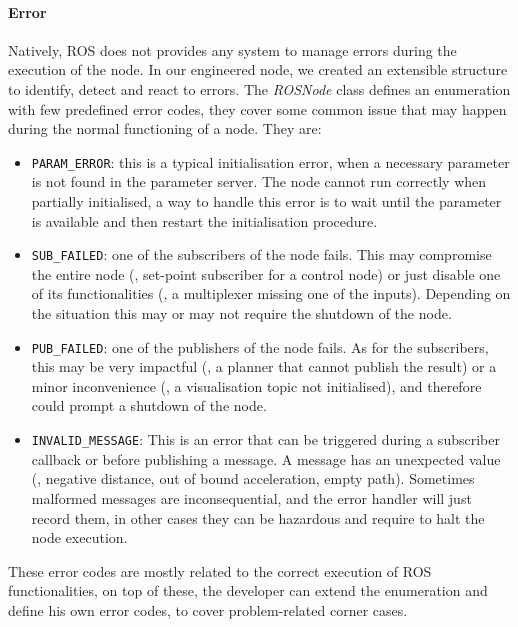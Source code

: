 \paragraph{Error} Natively, ROS does not provides any system to manage errors during the execution of the node. In our engineered node, we created an extensible structure to identify, detect and react to errors. The \textit{ROSNode} class defines an enumeration with few predefined error codes, they cover some common issue that may happen during the normal functioning of a node. They are:
\begin{itemize}
\item \texttt{PARAM\_ERROR}: this is a typical initialisation error, when a necessary parameter is not found in the parameter server. The node cannot run correctly when partially initialised, a way to handle this error is to wait until the parameter is available and then restart the initialisation procedure.
\item \texttt{SUB\_FAILED}: one of the subscribers of the node fails. This may compromise the entire node (\eg, set-point subscriber for a control node) or just disable one of its functionalities (\eg, a multiplexer missing one of the inputs). Depending on the situation this may or may not require the shutdown of the node. 
\item \texttt{PUB\_FAILED}: one of the publishers of the node fails. As for the subscribers, this may be very impactful (\eg, a planner that cannot publish the result) or a minor inconvenience (\eg, a visualisation topic not initialised), and therefore could prompt a shutdown of the node.
\item \texttt{INVALID\_MESSAGE}: This is an error that can be triggered during a subscriber callback or before publishing a message. A message has an unexpected value (\eg, negative distance, out of bound acceleration, empty path). Sometimes malformed messages are inconsequential, and the error handler will just record them, in other cases they can be hazardous and require to halt the node execution. 
\end{itemize}

These error codes are mostly related to the correct execution of ROS functionalities, on top of these, the developer can extend the enumeration and define his own error codes, to cover problem-related corner cases. 

